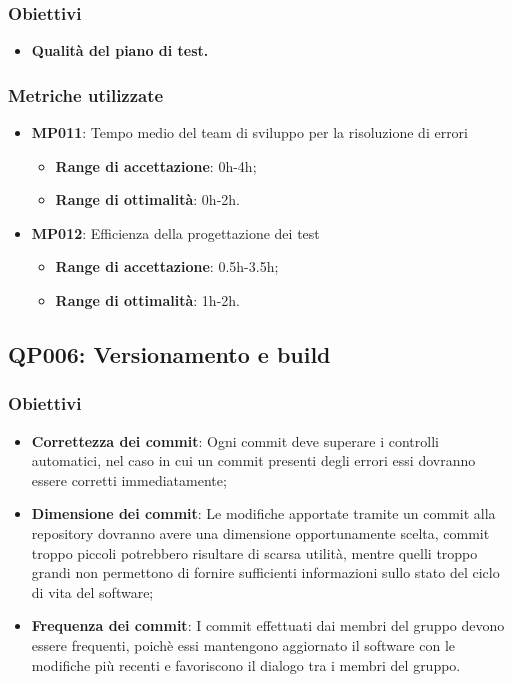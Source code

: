 \subsubsection{Obiettivi}
\begin{itemize}
	\item \textbf{Qualità del piano di test.} 
\end{itemize}
\subsubsection{Metriche utilizzate}
\begin{itemize}
	\item \textbf{MP011}: Tempo medio del team di sviluppo per la risoluzione di errori
	\begin{itemize}
		\item \textbf{Range di accettazione}: 0h-4h;
		\item \textbf{Range di ottimalità}: 0h-2h.
	\end{itemize}
	\item \textbf{MP012}: Efficienza della progettazione dei test
	\begin{itemize}
		\item \textbf{Range di accettazione}: 0.5h-3.5h;
		\item \textbf{Range di ottimalità}: 1h-2h.
	\end{itemize}
\end{itemize}


\subsection{QP006: Versionamento e build}\label{pro6}
\subsubsection{Obiettivi}
\begin{itemize}
	\item \textbf{Correttezza dei commit}: Ogni commit deve superare i controlli automatici, nel caso in cui un commit presenti degli errori  essi dovranno essere corretti immediatamente;
	\item \textbf{Dimensione dei commit}: Le modifiche apportate tramite un commit alla repository dovranno avere una dimensione opportunamente scelta, commit troppo piccoli potrebbero risultare di scarsa utilità, mentre quelli troppo grandi non permettono di fornire sufficienti informazioni sullo stato del ciclo di vita del software;
	\item  \textbf{Frequenza dei commit}: I commit effettuati dai membri del gruppo devono essere frequenti, poichè essi mantengono aggiornato il software con le modifiche più recenti e favoriscono il dialogo tra i membri del gruppo.
	
\end{itemize}
